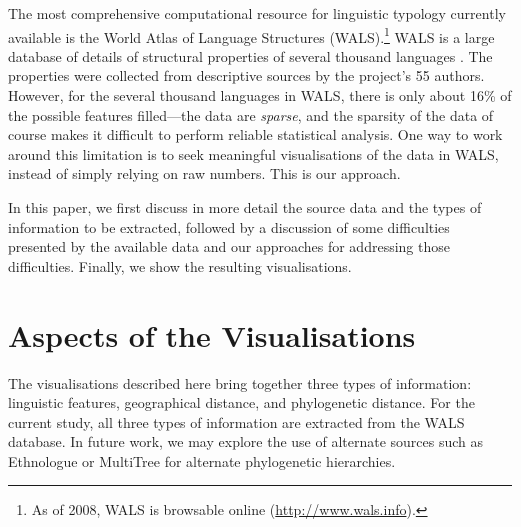 \documentclass[11pt]{article}
\begin{document}

The most comprehensive computational resource for linguistic typology currently available is the World Atlas of Language Structures (WALS).\footnote{As of 2008, WALS is browsable online (\url{http://www.wals.info}).}  WALS is a large database of details of structural properties of several thousand languages \cite{wals-2011}. The properties were collected from descriptive sources by the project's 55 authors. 
However, for the several thousand languages in WALS, there is only about 16\% of the possible features filled---the data are \emph{sparse}, and the sparsity of the data of course makes it difficult to perform reliable statistical analysis. One way to work around this limitation is to seek meaningful visualisations of the data in WALS, instead of simply relying on raw numbers. This is our approach. 

In this paper, we first discuss in more detail the source data and the types of information to be extracted, followed by a discussion of some difficulties presented by the available data and our approaches for addressing those difficulties. Finally, we show the resulting visualisations.

\section{Aspects of the Visualisations}

The visualisations described here bring together three types of information: linguistic features, geographical distance, and phylogenetic distance. For the current study, all three types of information are extracted from the WALS database. In future work, we may explore the use of alternate sources such as Ethnologue \cite{ethnologue} or MultiTree  for alternate phylogenetic hierarchies. 


\end{document}
